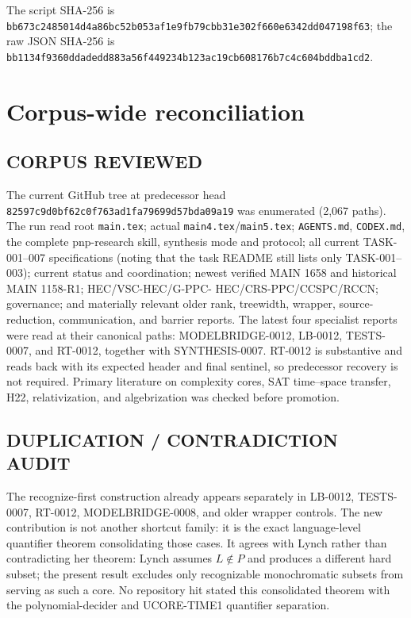 \documentclass[11pt]{article}
\begin{document}
The script SHA-256 is
\nolinkurl{bb673c2485014d4a86bc52b053af1e9fb79cbb31e302f660e6342dd047198f63};
the raw JSON SHA-256 is
\nolinkurl{bb1134f9360ddadedd883a56f449234b123ac19cb608176b7c4c604bddba1cd2}.

\section{Corpus-wide reconciliation}

\subsection*{CORPUS REVIEWED}
The current GitHub tree at predecessor head
\texttt{82597c9d0bf62c0f763ad1fa79699d57bda09a19} was enumerated (2,067
paths).  The run read root \texttt{main.tex}; actual
\texttt{main4.tex}/\texttt{main5.tex}; \texttt{AGENTS.md},
\texttt{CODEX.md}, the complete pnp-research skill, synthesis mode and
protocol; all current TASK-001--007 specifications (noting that the task
README still lists only TASK-001--003); current status and coordination;
newest verified MAIN 1658 and historical MAIN 1158-R1; HEC/VSC-HEC/G-PPC-
HEC/CRS-PPC/CCSPC/RCCN; governance; and materially relevant older rank,
treewidth, wrapper, source-reduction, communication, and barrier reports.
The latest four specialist reports were read at their canonical paths:
MODELBRIDGE-0012, LB-0012, TESTS-0007, and RT-0012, together with
SYNTHESIS-0007.  RT-0012 is substantive and reads back with its expected
header and final sentinel, so predecessor recovery is not required.
Primary literature on complexity cores, SAT time--space transfer, H22,
relativization, and algebrization was checked before promotion.

\subsection*{DUPLICATION / CONTRADICTION AUDIT}
The recognize-first construction already appears separately in LB-0012,
TESTS-0007, RT-0012, MODELBRIDGE-0008, and older wrapper controls.  The new
contribution is not another shortcut family: it is the exact language-level
quantifier theorem consolidating those cases.  It agrees with Lynch rather
than contradicting her theorem: Lynch assumes $L\notin P$ and produces a
different hard subset; the present result excludes only recognizable
monochromatic subsets from serving as such a core.  No repository hit stated
this consolidated theorem with the polynomial-decider and UCORE-TIME1
quantifier separation.
\end{document}
